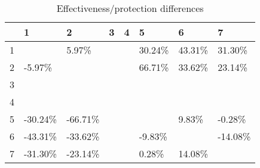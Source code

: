 \begin{table}[ht]
\centering
\begin{tabular}{rlllllll}
  \hline
 & 1 & 2 & 3 & 4 & 5 & 6 & 7 \\ 
  \hline
1 &  & 5.97\% &  &  & 30.24\% & 43.31\% & 31.30\% \\ 
  2 & -5.97\% &  &  &  & 66.71\% & 33.62\% & 23.14\% \\ 
  3 &  &  &  &  &  &  &  \\ 
  4 &  &  &  &  &  &  &  \\ 
  5 & -30.24\% & -66.71\% &  &  &  & 9.83\% & -0.28\% \\ 
  6 & -43.31\% & -33.62\% &  &  & -9.83\% &  & -14.08\% \\ 
  7 & -31.30\% & -23.14\% &  &  & 0.28\% & 14.08\% &  \\ 
   \hline
\end{tabular}
\caption{Effectiveness/protection differences} 
\end{table}
